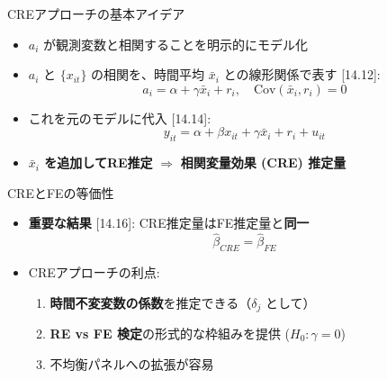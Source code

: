 \documentclass[
  ignorenonframetext,
]{beamer}
\providecommand{\tightlist}{%
  \setlength{\itemsep}{0pt}\setlength{\parskip}{0pt}}
\begin{document}
\begin{frame}{CREアプローチの基本アイデア}
\label{creux30a2ux30d7ux30edux30fcux30c1ux306eux57faux672cux30a2ux30a4ux30c7ux30a2}
\begin{itemize}
\tightlist
\item
  \(a_i\) が観測変数と相関することを明示的にモデル化
\item
  \(a_i\) と \(\{x_{it}\}\) の相関を、時間平均 \(\bar{x}_i\)
  との線形関係で表す {[}14.12{]}:
  \[a_i = \alpha + \gamma \bar{x}_i + r_i, \quad \text{Cov}(\bar{x}_i, r_i) = 0\]
\item
  これを元のモデルに代入 {[}14.14{]}:
  \[y_{it} = \alpha + \beta x_{it} + \gamma \bar{x}_i + r_i + u_{it}\]
\item
  \textbf{\(\bar{x}_i\) を追加してRE推定} \(\Rightarrow\)
  \textbf{相関変量効果 (CRE) 推定量}
\end{itemize}
\end{frame}

\begin{frame}{CREとFEの等価性}
\label{creux3068feux306eux7b49ux4fa1ux6027}
\begin{itemize}
\tightlist
\item
  \textbf{重要な結果} {[}14.16{]}: CRE推定量はFE推定量と\textbf{同一}
  \[\hat{\beta}_{CRE} = \hat{\beta}_{FE}\]
\item
  CREアプローチの利点:

  \begin{enumerate}
  \tightlist
  \item
    \textbf{時間不変変数の係数}を推定できる（\(\delta_j\) として）
  \item
    \textbf{RE vs FE 検定}の形式的な枠組みを提供 (\(H_0: \gamma = 0\))
  \item
    不均衡パネルへの拡張が容易
  \end{enumerate}
\end{itemize}
\end{frame}
\end{document}
